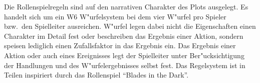 
Die Rollenspielregeln sind auf den narrativen Charakter des Plots ausgelegt. Es handelt sich um ein W6 W"urfelsystem bei dem vier W"urfel pro Spieler bzw.~den Spielleiter ausreichen. W"urfel legen dabei nicht die Eigenschaften einen Charakter im Detail fest oder beschreiben das Ergebnis einer Aktion, sondern speisen lediglich einen Zufallsfaktor in das Ergebnis ein. Das Ergebnis einer Aktion oder auch eines Ereignisses legt der Spielleiter unter Ber"ucksichtigung der Handlungen und des W"urfelergebnisses selbst fest. Das Regelsystem ist in Teilen inspiriert durch das Rollenspiel ``Blades in the Dark''.











